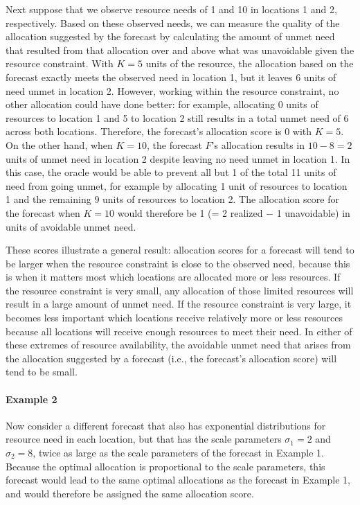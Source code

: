 \documentclass{article}\usepackage[]{graphicx}\usepackage[]{xcolor}
\begin{document}
Next suppose that we observe resource needs of 1 and 10 in locations 1 and 2, respectively.
Based on these observed needs, we can measure the quality of the allocation suggested by the forecast by calculating the amount of unmet need that resulted from that allocation over and above what was unavoidable given the resource constraint.
With $K = 5$ units of the resource, the allocation based on the forecast exactly meets the observed need in location 1, but it leaves 6 units of need unmet in location 2.
However, working within the resource constraint, no other allocation could have done better: for example, allocating 0 units of resources to location 1 and 5 to location 2 still results in a total unmet need of 6 across both locations. Therefore, the forecast's allocation score is 0 with $K = 5$.
On the other hand, when $K = 10$, the forecast $F$'s allocation results in $10 - 8 = 2$ units of unmet need in location 2 despite leaving no need unmet in location 1.
In this case, the oracle would be able to prevent all but 1 of the total 11 units of need from going unmet, for example by allocating 1 unit of resources to location 1 and the remaining 9 units of resources to location 2.
The allocation score for the forecast when $K = 10$ would therefore be 1 (= 2 realized $-$ 1 unavoidable) in units of avoidable unmet need.

These scores illustrate a general result: allocation scores for a forecast will tend to be larger when the resource constraint is close to the observed need, because this is when it matters most which locations are allocated more or less resources. If the resource constraint is very small, any allocation of those limited resources will result in a large amount of unmet need. If the resource constraint is very large, it becomes less important which locations receive relatively more or less resources because all locations will receive enough resources to meet their need. In either of these extremes of resource availability, the avoidable unmet need that arises from the allocation suggested by a forecast (i.e., the forecast's allocation score) will tend to be small.

\paragraph{Example 2} Now consider a different forecast that also has exponential distributions for resource need in each location, but that has the scale parameters $\sigma_1 = 2$ and $\sigma_2 = 8$, twice as large as the scale parameters of the forecast in Example 1. Because the optimal allocation is proportional to the scale parameters, this forecast would lead to the same optimal allocations as the forecast in Example 1, and would therefore be assigned the same allocation score.
\end{document}
